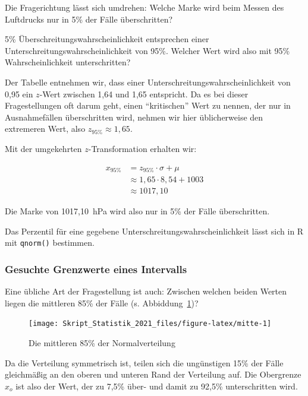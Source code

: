 \documentclass[
  11pt,
  ngerman,
  a4paper,
]{report}
\newenvironment{rtip}{
  \medskip
  \begin{tcolorbox}[colframe=purple,colback=light_gray,title=Softwarehinweis]
}{
  \end{tcolorbox}
  \medskip
}
\begin{document}
Die Fragerichtung lässt sich umdrehen: Welche Marke wird beim Messen des Luftdrucks nur in 5\% der Fälle überschritten?

5\% Überschreitungswahrscheinlichkeit entsprechen einer Unterschreitungswahrscheinlichkeit von 95\%. Welcher Wert wird also mit 95\% Wahrscheinlichkeit unterschritten?

Der Tabelle entnehmen wir, dass einer Unterschreitungswahrscheinlichkeit von 0,95 ein \(z\)-Wert zwischen 1,64 und 1,65 entspricht. Da es bei dieser Fragestellungen oft darum geht, einen \enquote{kritischen} Wert zu nennen, der nur in Ausnahmefällen überschritten wird, nehmen wir hier üblicherweise den extremeren Wert, also \(z_{95\%}\approx 1,65\).

Mit der umgekehrten \(z\)-Transformation erhalten wir:

\[
  \begin{aligned}
    x_{95\%}&=z_{95\%}\cdot \sigma + \mu \\
       &\approx 1{,}65\cdot 8{,}54 + 1003\\
       &\approx 1017{,}10
  \end{aligned}
\]

Die Marke von 1017,10~hPa wird also nur in 5\% der Fälle überschritten.

\begin{rtip}
Das Perzentil für eine gegebene Unterschreitungswahrscheinlichkeit lässt sich in R mit \verb|qnorm()| bestimmen.
\end{rtip}

\hypertarget{gesuchte-grenzwerte-eines-intervalls}{%
\subsubsection{Gesuchte Grenzwerte eines Intervalls}\label{gesuchte-grenzwerte-eines-intervalls}}

Eine übliche Art der Fragestellung ist auch: Zwischen welchen beiden Werten liegen die mittleren 85\% der Fälle (s. Abbiddung~\ref{fig:mitte})?

\begin{figure}[!h]

{\centering \texttt{[image: Skript\_Statistik\_2021\_files/figure-latex/mitte-1]} 

}

\caption{Die mittleren 85\% der Normalverteilung}\label{fig:mitte}
\end{figure}

Da die Verteilung symmetrisch ist, teilen sich die ungünstigen 15\% der Fälle gleichmäßig an den oberen und unteren Rand der Verteilung auf. Die Obergrenze \(x_o\) ist also der Wert, der zu 7,5\% über- und damit zu 92,5\% unterschritten wird.
\end{document}
